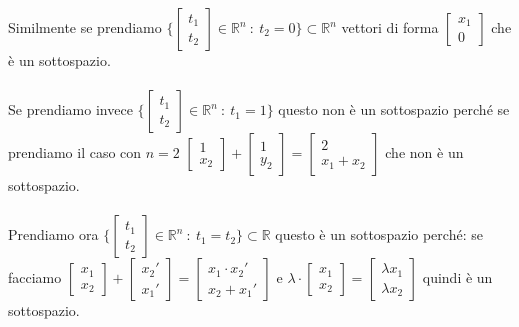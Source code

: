 \begin{example}
Similmente se prendiamo $\Bigg \{\begin{bmatrix}t_1\\ t_2\end{bmatrix} \in \mathbb{R}^n \: : \: t_2 = 0\Bigg\} \subset \mathbb{R}^n$ vettori di forma  $\begin{bmatrix}x_1\\0\end{bmatrix}$ che è un sottospazio.\\\\
Se prendiamo invece $\Bigg \{\begin{bmatrix}t_1\\ t_2\end{bmatrix} \in \mathbb{R}^n \: : \: t_1 = 1\Bigg\}$ questo non è un sottospazio perché se prendiamo il caso con $n=2$ $\begin{bmatrix}1\\x_2\end{bmatrix} + \begin{bmatrix}1\\y_2\end{bmatrix} = \begin{bmatrix}2\\x_1 + x_2\end{bmatrix}$ che non è un sottospazio.\\\\
Prendiamo ora $\Bigg \{\begin{bmatrix}t_1\\ t_2\end{bmatrix} \in \mathbb{R}^n \: : \: t_1 = t_2\Bigg\} \subset \mathbb{R}$ questo è un sottospazio perché:
se facciamo $\begin{bmatrix}x_1\\x_2\end{bmatrix} + \begin{bmatrix}x_2'\\x_1'\end{bmatrix} = \begin{bmatrix}x_1 \cdot x_2'\\x_2 + x_1'\end{bmatrix}$ e $\lambda \cdot\begin{bmatrix}x_1 \\ x_2\end{bmatrix} = \begin{bmatrix}\lambda x_1 \\ \lambda x_2\end{bmatrix}$ quindi è un sottospazio.
\end{example}

